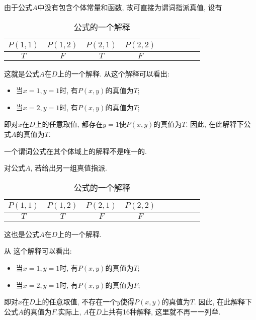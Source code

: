 \begin{result}
由于公式$A$中没有包含个体常量和函数, 故可直接为谓词指派真值, 设有
\begin{table}[H]
\caption{公式的一个解释}
\vspace{-0.6cm}
\begin{center}
\begin{tabular} {ccccccccc}
  \hline
     $P(1,1)$&	  $P(1,2)$	&   $P(2,1)$&	   $P(2,2)$\\
  \hline
     $T$	&      $F$	  &   $T$	    &   $F$\\
\hline
\end{tabular}
\end{center}
\label{AI_table2019113001}
\end{table}
这就是公式$A$在$D$上的一个解释. 从这个解释可以看出:
\begin{itemize}
\item 当$x=1, y=1$时, 有$P(x,y)$的真值为$T$;
\item 当$x=2, y=1$时, 有$P(x,y)$的真值为$T$;
\end{itemize}
即对$x$在$D$上的任意取值, 都存在$y=1$使$P(x,y)$的真值为$T$. 因此, 在此解释下公式$A$的真值为$T$.
\begin{remark}
  一个谓词公式在其个体域上的解释不是唯一的.
\begin{example}
对公式$A$, 若给出另一组真值指派.
\begin{table}[H]
\caption{公式的一个解释}
\vspace{-0.6cm}
\begin{center}
\begin{tabular} {ccccccccc}
\hline
     $P(1,1)$&	  $P(1,2)$	&   $P(2,1)$&	   $P(2,2)$\\
\hline
     $T$	&      $T$	  &   $F$	    &   $F$\\
\hline
\end{tabular}
\end{center}
\label{AI_table2019113002}
\end{table}
这也是公式$A$在$D$上的一个解释.
\end{example}
\end{remark}
从 这个解释可以看出:
\begin{itemize}
\item 当$x=1,y=1$时, 有$P(x,y)$的真值为$T$;
\item 当$x=2,y=1$时, 有$P(x,y)$的真值为$F$;
\end{itemize}
即对$x$在$D$上的任意取值, 不存在一个$y$使得$P(x,y)$的真值为$T$. 因此, 在此解释下公式$A$的真值为$F$.实际上, $A$在$D$上共有16种解释, 这里就不再一一列举.
\end{result}
